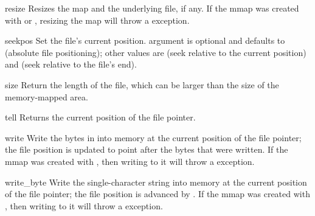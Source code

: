 \begin{methoddesc}{resize}{}
  Resizes the map and the underlying file, if any.
  If the mmap was created with  or
  , resizing the map will throw a  exception.
\end{methoddesc}

\begin{methoddesc}{seek}{pos}
  Set the file's current position.   argument is optional
  and defaults to  (absolute file positioning); other values
  are  (seek relative to the current position) and 
  (seek relative to the file's end).
\end{methoddesc}

\begin{methoddesc}{size}{}
  Return the length of the file, which can be larger than the size of
  the memory-mapped area.
\end{methoddesc}

\begin{methoddesc}{tell}{}
  Returns the current position of the file pointer.
\end{methoddesc}

\begin{methoddesc}{write}{}
  Write the bytes in  into memory at the current position
  of the file pointer; the file position is updated to point after the
  bytes that were written. If the mmap was created with
  , then writing to it will throw a
   exception.
\end{methoddesc}

\begin{methoddesc}{write_byte}{}
  Write the single-character string  into memory at the
  current position of the file pointer; the file position is advanced
  by . If the mmap was created with ,
  then writing to it will throw a  exception.
\end{methoddesc}
